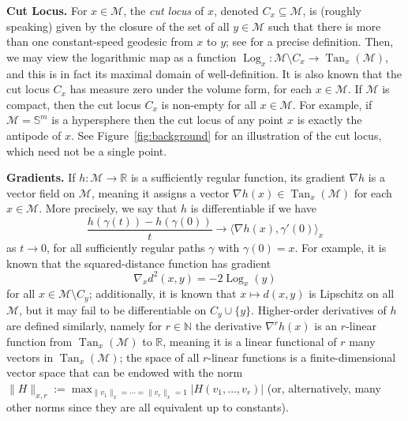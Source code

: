 \documentclass[preprint]{imsart}
\theoremstyle{plain}
\theoremstyle{definition}
\newcommand{\Rbb}{\mathbb{R}}
\newcommand{\Nbb}{\mathbb{N}}
\newcommand{\Mcal}{\mathcal{M}}
\DeclareMathOperator{\Tan}{Tan}
\DeclareMathOperator{\Log}{Log}
\begin{document}
\medskip

\noindent \textbf{Cut Locus.} 
For $x\in\Mcal$, the \textit{cut locus} of $x$, denoted $C_x\subseteq\Mcal$, is (roughly speaking) given by the closure of the set of all $y\in\Mcal$ such that there is more than one constant-speed geodesic from $x$ to $y$; see \cite[Definition~1.3.9]{Aubin} for a precise definition.
Then, we may view the logarithmic map as a function $\Log_x:\Mcal\setminus C_x\to\Tan_x(\Mcal)$, and this is in fact its maximal domain of well-definition.
It is also known that the cut locus $C_x$ has measure zero under the volume form, for each $x\in\Mcal$.
If $\Mcal$ is compact, then the cut locus $C_x$ is non-empty for all $x\in\Mcal$.
For example, if $\Mcal=\mathbb{S}^m$ is a hypersphere then the cut locus of any point $x$ is exactly the antipode of $x$.
See Figure~\ref{fig:background} for an illustration of the cut locus, which need not be a single point.

\medskip

\noindent \textbf{Gradients.} If $h:\Mcal\to\Rbb$ is a sufficiently regular function, its gradient $\nabla h$ is a vector field on $\Mcal$, meaning it assigns a vector $\nabla h(x)\in\Tan_x(\Mcal)$ for each $x\in\Mcal$.
More precisely, we say that $h$ is differentiable if we have
\begin{equation}\label{eqn:Gradient}
    \frac{h(\gamma(t))-h(\gamma(0))}{t} \to \langle\nabla h(x),\gamma'(0)\rangle_x
\end{equation}
as $t\to 0$, for all sufficiently regular paths $\gamma$ with $\gamma(0)=x$.
For example, it is known that the squared-distance function has gradient
\begin{equation}\label{eqn:squared-dist-grad}
    \nabla_xd^2(x,y) = -2\Log_x(y)
\end{equation}
for all $x\in\Mcal\setminus C_y$; additionally, it is known that $x\mapsto d(x,y)$ is Lipschitz on all $\Mcal$, but it may fail to be differentiable on $C_y \cup \{y\}$.
Higher-order derivatives of $h$ are defined similarly, namely for $r\in\Nbb$ the derivative $\nabla^{r}h(x)$ is an $r$-linear function from $\Tan_x(\Mcal)$ to $\Rbb$, meaning it is a linear functional of $r$ many vectors in $\Tan_x(\Mcal)$; the space of all $r$-linear functions is a finite-dimensional vector space that can be endowed with the norm $\|H\|_{x,r}:=\max_{\|v_1\|_x=\cdots=\|v_r\|_x=1}|H(v_1,\ldots, v_r)|$ (or, alternatively, many other norms since they are all equivalent up to constants). 

\medskip
\end{document}

